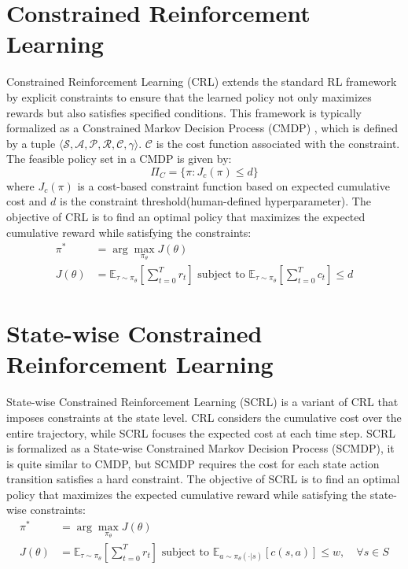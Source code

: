 \section{Constrained Reinforcement Learning}

Constrained Reinforcement Learning (CRL) extends the standard RL framework by explicit constraints to ensure that the learned policy not only maximizes rewards but also satisfies specified conditions.
This framework is typically formalized as a Constrained Markov Decision Process (CMDP) \cite{CMDP}, which is defined by a tuple $\langle \mathcal{S}, \mathcal{A}, \mathcal{P}, \mathcal{R}, \mathcal{C}, \gamma \rangle$.
$\mathcal{C}$ is the cost function associated with the constraint.
The feasible policy set in a CMDP is given by:
\begin{equation}
  \Pi_C = \{\pi: J_c(\pi) \leq d \}
\end{equation}
where $J_c(\pi)$ is a cost-based constraint function based on expected cumulative cost and $d$ is the constraint threshold(human-defined hyperparameter).
The objective of CRL is to find an optimal policy that maximizes the expected cumulative reward while satisfying the constraints:
\begin{equation} \label{chap1:eq:crl-objective}
  \begin{aligned}
    \pi^* &= \arg\max_{\pi_\theta} J(\theta) \\
    J(\theta) &= \mathbb{E}_{\tau \sim \pi_\theta} \left[ \sum^T_{t = 0} r_t \right] \text{ subject to } \mathbb{E}_{\tau \sim \pi_\theta} \left[ \sum^T_{t = 0} c_t \right] \leq d
  \end{aligned}
\end{equation}

\section{State-wise Constrained Reinforcement Learning}

State-wise Constrained Reinforcement Learning (SCRL) is a variant of CRL that imposes constraints at the state level.
CRL considers the cumulative cost over the entire trajectory, while SCRL focuses the expected cost at each time step.
SCRL is formalized as a State-wise Constrained Markov Decision Process (SCMDP), it is quite similar to CMDP, but SCMDP requires the cost for each state action transition satisfies a hard constraint.
The objective of SCRL is to find an optimal policy that maximizes the expected cumulative reward while satisfying the state-wise constraints:
\begin{equation} \label{chap1:eq:scrl-objective}
  \begin{aligned}
    \pi^* &= \arg\max_{\pi_\theta} J(\theta) \\
    J(\theta) &= \mathbb{E}_{\tau \sim \pi_\theta} \left[ \sum^T_{t = 0} r_t \right] \text{ subject to } \mathbb{E}_{a \sim \pi_\theta(\cdot|s)}  [c(s, a)] \leq w, \quad \forall s \in S
  \end{aligned}
\end{equation}

